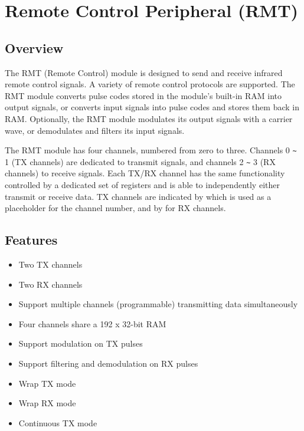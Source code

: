\documentclass[main\_\_EN.tex]{subfiles}
\begin{document}

\ifglobal
\else
    {\let\clearpage\relax \listoftodos}
    \tableofcontents
\fi



\hypertarget{rmt}{}
\chapter{Remote Control Peripheral (RMT)}
\label{mod:rmt}


\section{Overview}
The RMT (Remote Control) module is designed to send and receive infrared remote control signals. A variety of remote control protocols are supported. The RMT module converts pulse codes stored in the module's built-in RAM into output signals, or converts input signals into pulse codes and stores them back in RAM. Optionally, the RMT module modulates its output signals with a carrier wave, or demodulates and filters its input signals.

The RMT module has four channels, numbered from zero to three. Channels 0 \verb+~+ 1 (TX channels) are dedicated to transmit signals, and channels 2 \verb+~+ 3 (RX channels) to receive signals. Each TX/RX channel has the same functionality controlled by a dedicated set of registers and is able to independently either transmit or receive data. TX channels are indicated by  which is used as a placeholder for the channel number, and by  for RX channels.

\section{Features}
\begin{itemize}
\item Two TX channels
\item Two RX channels
\item Support multiple channels (programmable) transmitting data simultaneously
\item Four channels share a 192 x 32-bit RAM
\item Support modulation on TX pulses
\item Support filtering and demodulation on RX pulses
\item Wrap TX mode
\item Wrap RX mode
\item Continuous TX mode
\end{itemize}
\end{document}
